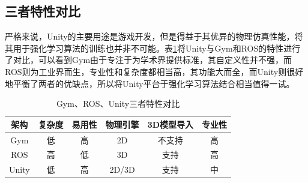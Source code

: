 \documentclass[bachelor]{thesis-uestc}
\begin{document}
	\subsection{三者特性对比}
	严格来说，Unity的主要用途是游戏开发，但是得益于其优异的物理仿真性能，将其用于强化学习算法的训练也并非不可能。表\ref{compare}将Unity与Gym和ROS的特性进行了对比，可以看到Gym由于专注于为学术界提供标准，其自定义性并不强，而ROS则为工业界而生，专业性和复杂度都相当高，其功能大而全，而Unity则很好地平衡了两者的优缺点，所以将Unity平台于强化学习算法结合相当值得一试。
	
	\begin{table}[h]
		\caption{Gym、ROS、Unity三者特性对比}
		\label{compare}
		\begin{tabular}{cccccc}
			\toprule[1.5pt]
			架构 & 复杂度 & 易用性 & 物理引擎 & 3D模型导入 & 专业性 \\
			\hline
			Gym & 低 & 高 & 2D & 不支持 & 高 \\
			
			ROS & 高 & 低 & 3D & 支持 & 高 \\
			
			Unity & 低 & 高 & 2D/3D & 支持 & 中 \\ 
			\bottomrule[1.5pt]
		\end{tabular}
	\end{table}
\end{document}
